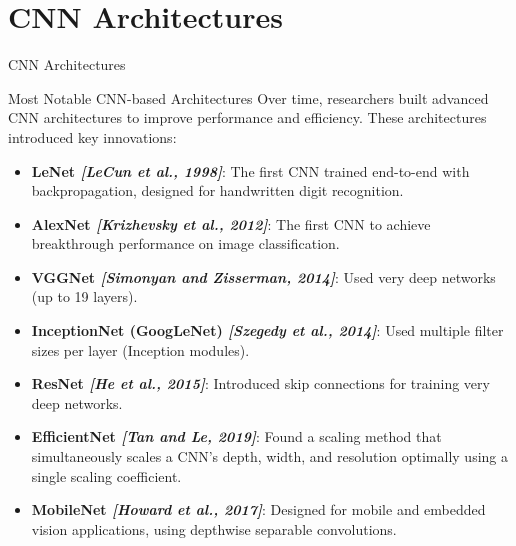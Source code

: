 \section{CNN Architectures}
\begin{frame}{}
    \LARGE CNN Architectures
\end{frame}

\begin{frame}{Most Notable CNN-based Architectures}
    Over time, researchers built advanced CNN architectures to improve performance and efficiency. These architectures introduced key innovations:
    {\small
    \begin{itemize}
        \item \textbf{LeNet \emph{[LeCun et al., 1998]}}: The first CNN trained end-to-end with backpropagation, designed for handwritten digit recognition.
        \item \textbf{AlexNet \emph{[Krizhevsky et al., 2012]}}:  The first CNN to achieve breakthrough performance on image classification.
        \item \textbf{VGGNet \emph{[Simonyan and Zisserman, 2014]}}: Used very deep networks (up to 19 layers).
        \item \textbf{InceptionNet (GoogLeNet) \emph{[Szegedy et al., 2014]}}: Used multiple filter sizes per layer (Inception modules).
        \item \textbf{ResNet \emph{[He et al., 2015]}}: Introduced skip connections for training very deep networks.
        \item \textbf{EfficientNet \emph{[Tan and Le, 2019]}}: Found a scaling method that  simultaneously scales a CNN’s depth, width, and resolution optimally using a single scaling coefficient.
        \item \textbf{MobileNet \emph{[Howard et al., 2017]}}: Designed for mobile and embedded vision applications, using depthwise separable convolutions.
    \end{itemize}
    }
\end{frame}









